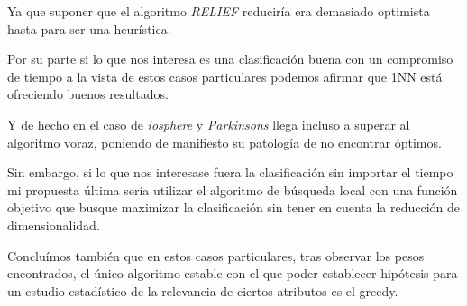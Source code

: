 Ya que suponer que el algoritmo \textit{RELIEF} reduciría era demasiado optimista hasta para ser una heurística.

Por su parte si lo que nos interesa es una clasificación buena con un compromiso de tiempo a la vista de estos casos particulares podemos afirmar que 1NN está ofreciendo buenos resultados. 

Y de hecho en el caso de \textit{iosphere} y \textit{Parkinsons} llega incluso a superar al algoritmo voraz, poniendo de manifiesto su patología de no encontrar óptimos. 

Sin embargo, si lo que nos interesase fuera la clasificación sin importar el tiempo
mi propuesta última sería utilizar el algoritmo de búsqueda local con una función objetivo que busque maximizar la clasificación sin tener en cuenta la reducción de dimensionalidad.

Concluímos también que en estos casos particulares, tras observar los pesos encontrados, el único algoritmo estable con el que poder establecer hipótesis para un estudio estadístico de la relevancia de ciertos atributos es el greedy.


